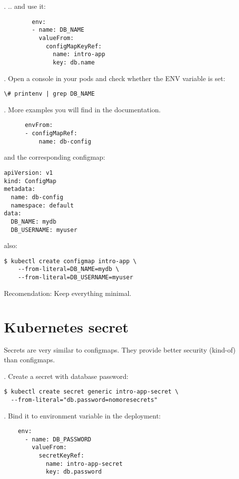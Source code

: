 \documentclass[12pt, letterpaper]{article}
\begin{document}
. .. and use it:

\begin{verbatim}
        env:
        - name: DB_NAME
          valueFrom:
            configMapKeyRef:
              name: intro-app
              key: db.name
\end{verbatim}

. Open a console in your pods and check whether the ENV variable is set:

\begin{verbatim}
\# printenv | grep DB_NAME
\end{verbatim}

. More examples you will find in the documentation.

\begin{verbatim}
      envFrom:
      - configMapRef:
          name: db-config
\end{verbatim}

and the corresponding configmap:

\begin{verbatim}
apiVersion: v1
kind: ConfigMap
metadata:
  name: db-config
  namespace: default
data:
  DB_NAME: mydb
  DB_USERNAME: myuser
\end{verbatim}

also:

\begin{verbatim}
$ kubectl create configmap intro-app \
    --from-literal=DB_NAME=mydb \
    --from-literal=DB_USERNAME=myuser
\end{verbatim}

\bigskip
Recomendation: Keep everything minimal. 

\section{Kubernetes secret}

Secrets are very similar to configmaps. They provide better security (kind-of) than configmaps.

. Create a secret with database password:

\begin{verbatim}
$ kubectl create secret generic intro-app-secret \
  --from-literal="db.password=nomoresecrets"
\end{verbatim}

. Bind it to environment variable in the deployment:

\begin{verbatim}
    env:
      - name: DB_PASSWORD
        valueFrom:
          secretKeyRef:
            name: intro-app-secret
            key: db.password
\end{verbatim}
\end{document}
